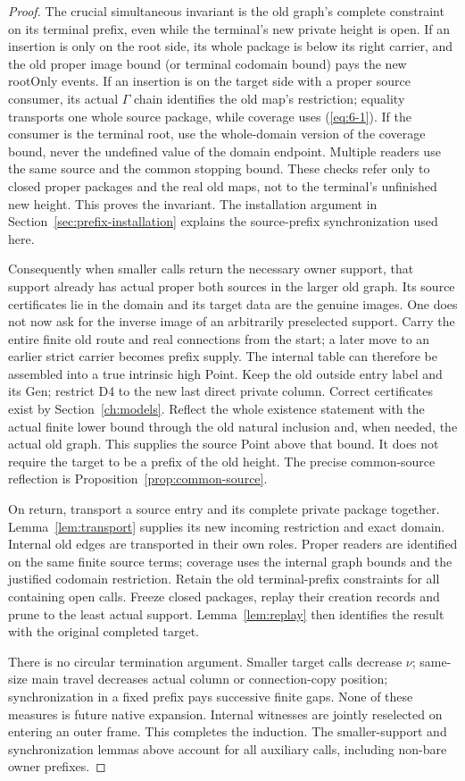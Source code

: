 \begin{proof}
The crucial simultaneous invariant is the old graph's complete
constraint on its terminal prefix, even while the terminal's new
private height is open. If an insertion is only on the root side,
its whole package is below its right carrier, and the old proper
image bound (or terminal codomain bound) pays the new rootOnly
events. If an insertion is on the target side with a proper source
consumer, its actual $\Gamma$ chain identifies the old map's
restriction; equality transports one whole source package, while
coverage uses (\ref{eq:6-1}). If the consumer is the terminal root, use the
whole-domain version of the coverage bound, never the undefined
value of the domain endpoint. Multiple readers use the same source
and the common stopping bound. These checks refer only to closed
proper packages and the real old maps, not to the terminal's
unfinished new height. This proves the invariant. The installation argument in
Section~\ref{sec:prefix-installation} explains the source-prefix
synchronization used here.

Consequently when smaller calls return the necessary owner support,
that support already has actual proper both sources in the larger
old graph. Its source certificates lie in the domain and its target
data are the genuine images. One does not now ask for the inverse
image of an arbitrarily preselected support. Carry the entire
finite old route and real connections from the start; a later move
to an earlier strict carrier becomes prefix supply. The internal
table can therefore be assembled into a true intrinsic high Point.
Keep the old outside entry label and its Gen; restrict D4 to the
new last direct private column. Correct certificates exist by
Section~\ref{ch:models}. Reflect the whole existence statement with
the actual finite lower bound through the old natural inclusion
and, when needed, the actual old graph. This supplies the source
Point above that bound. It does not require the target to be a
prefix of the old height. The precise common-source reflection is
Proposition~\ref{prop:common-source}.

On return, transport a source entry and its complete private package
together. Lemma~\ref{lem:transport} supplies its new incoming
restriction and exact domain. Internal old edges are transported
in their own roles. Proper readers are identified on the same
finite source terms; coverage uses the internal graph bounds and
the justified codomain restriction. Retain the old terminal-prefix
constraints for all containing open calls. Freeze closed packages,
replay their creation records and prune to the least actual support.
Lemma~\ref{lem:replay} then identifies the result with the original
completed target.

There is no circular termination argument. Smaller target calls
decrease $\nu$; same-size main travel decreases actual column or
connection-copy position; synchronization in a fixed prefix pays
successive finite gaps. None of these measures is future native
expansion. Internal witnesses are jointly reselected on entering an
outer frame. This completes the induction. The smaller-support and synchronization lemmas above account for
all auxiliary calls, including non-bare owner prefixes.
\end{proof}

